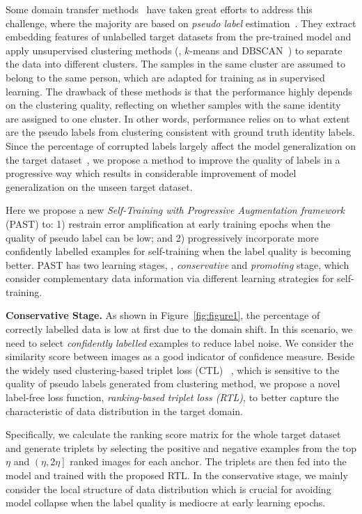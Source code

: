\documentclass[10pt,twocolumn,letterpaper]{article}
\begin{document}
Some domain transfer methods~\cite{HHL, EANet, UMDL, PUL, tfusion, ARN, theory, stepwise} have taken great efforts to address this challenge, where the majority are based on \emph{pseudo label} estimation~\cite{PUL, theory, tfusion}.
They extract embedding features of unlabelled target datasets from the pre-trained model and apply unsupervised clustering methods (\eg, $k$-means and $\text{DBSCAN}$~\cite{DBSCAN}) to separate the data into different clusters. 
The samples in the same cluster are assumed to belong to the same person, which are adapted for training as in supervised learning.
The drawback of these methods is that the performance highly depends on the clustering quality, reflecting on whether samples with the same identity are assigned to one cluster. 
In other words, performance relies on to what extent are the pseudo labels from clustering consistent with ground truth identity labels.
Since the percentage of corrupted labels largely affect the model generalization on the target dataset~\cite{generalization}, we propose a method to improve the quality of labels in a progressive way which results in considerable improvement of model generalization on the unseen target dataset.

Here 
we propose a 
new 
\emph{Self-Training with Progressive Augmentation framework} (PAST) to: 1) restrain error amplification at early training epochs when the quality of pseudo label can be low; and 2) progressively incorporate more confidently labelled examples for self-training when the label quality is becoming better. PAST has two learning stages, \ie, \emph{conservative} and \emph{promoting} stage, which consider complementary data information via different learning strategies for self-training.

\noindent\textbf{Conservative Stage.}
As shown in Figure~\ref{fig:figure1}, the percentage of correctly labelled data is low at first due to the domain shift. In this scenario, we need to select \textit{confidently labelled} examples to reduce label noise. We consider the similarity score between images as a good indicator of confidence measure. Beside 
the widely used clustering-based triplet loss (CTL) ~\cite{batchhardtriplet}, which is sensitive to the quality of pseudo labels generated from clustering method, we propose a novel label-free loss function, \emph{ranking-based triplet loss (RTL)}, to better capture the characteristic of data distribution in the target domain.

Specifically, we calculate the ranking score matrix for the whole target dataset and generate triplets by selecting the positive and negative examples from the top $\eta$ and  $\left(\eta, 2\eta\right]$ ranked images for each anchor. The triplets are then fed into the model and trained with the proposed RTL. 
In the conservative stage, we mainly consider the local structure of data distribution which is crucial for avoiding model collapse when the label quality is mediocre at early learning epochs.
\end{document}
